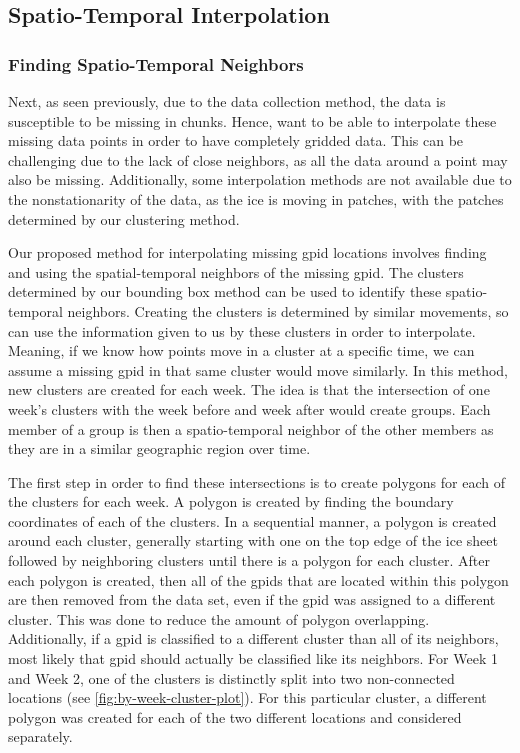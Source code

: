 \documentclass[12pt]{article}
\begin{document}
\hypertarget{spatio-temporal-interpolation}{%
\subsection{Spatio-Temporal
Interpolation}\label{spatio-temporal-interpolation}}

\hypertarget{finding-spatio-temporal-neighbors}{%
\subsubsection{Finding Spatio-Temporal
Neighbors}\label{finding-spatio-temporal-neighbors}}

Next, as seen previously, due to the data collection method, the data is
susceptible to be missing in chunks. Hence, want to be able to
interpolate these missing data points in order to have completely
gridded data. This can be challenging due to the lack of close
neighbors, as all the data around a point may also be missing.
Additionally, some interpolation methods are not available due to the
nonstationarity of the data, as the ice is moving in patches, with the
patches determined by our clustering method.

Our proposed method for interpolating missing gpid locations involves
finding and using the spatial-temporal neighbors of the missing gpid.
The clusters determined by our bounding box method can be used to
identify these spatio-temporal neighbors. Creating the clusters is
determined by similar movements, so can use the information given to us
by these clusters in order to interpolate. Meaning, if we know how
points move in a cluster at a specific time, we can assume a missing
gpid in that same cluster would move similarly. In this method, new
clusters are created for each week. The idea is that the intersection of
one week's clusters with the week before and week after would create
groups. Each member of a group is then a spatio-temporal neighbor of the
other members as they are in a similar geographic region over time.

The first step in order to find these intersections is to create
polygons for each of the clusters for each week. A polygon is created by
finding the boundary coordinates of each of the clusters. In a
sequential manner, a polygon is created around each cluster, generally
starting with one on the top edge of the ice sheet followed by
neighboring clusters until there is a polygon for each cluster. After
each polygon is created, then all of the gpids that are located within
this polygon are then removed from the data set, even if the gpid was
assigned to a different cluster. This was done to reduce the amount of
polygon overlapping. Additionally, if a gpid is classified to a
different cluster than all of its neighbors, most likely that gpid
should actually be classified like its neighbors. For Week 1 and Week 2,
one of the clusters is distinctly split into two non-connected locations
(see \cref{fig:by-week-cluster-plot}). For this particular cluster, a
different polygon was created for each of the two different locations
and considered separately.
\end{document}
